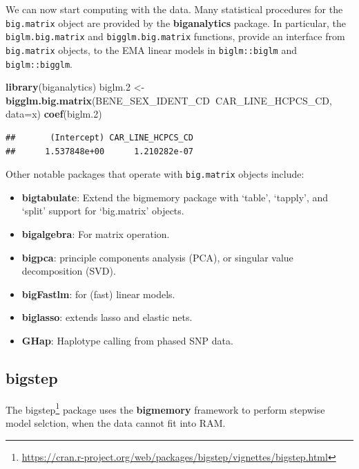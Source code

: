 \documentclass[]{book}
\newenvironment{Shaded}{\begin{snugshade}}{\end{snugshade}}
\newcommand{\DataTypeTok}[1]{\textcolor[rgb]{0.13,0.29,0.53}{#1}}
\newcommand{\FloatTok}[1]{\textcolor[rgb]{0.00,0.00,0.81}{#1}}
\newcommand{\KeywordTok}[1]{\textcolor[rgb]{0.13,0.29,0.53}{\textbf{#1}}}
\newcommand{\NormalTok}[1]{#1}
\newcommand{\OperatorTok}[1]{\textcolor[rgb]{0.81,0.36,0.00}{\textbf{#1}}}
\newcommand{\StringTok}[1]{\textcolor[rgb]{0.31,0.60,0.02}{#1}}
\providecommand{\tightlist}{%
  \setlength{\itemsep}{0pt}\setlength{\parskip}{0pt}}
\renewcommand{\href}[2]{#2\footnote{\url{#1}}}
\theoremstyle{definition}
\theoremstyle{definition}
\theoremstyle{definition}
\theoremstyle{remark}
\begin{document}
We can now start computing with the data.
Many statistical procedures for the \texttt{big.matrix} object are provided by the \textbf{biganalytics} package.
In particular, the \texttt{biglm.big.matrix} and \texttt{bigglm.big.matrix} functions, provide an interface from \texttt{big.matrix} objects, to the EMA linear models in \texttt{biglm::biglm} and \texttt{biglm::bigglm}.

\begin{Shaded}
\begin{Highlighting}[]
\KeywordTok{library}\NormalTok{(biganalytics)}
\NormalTok{biglm}\FloatTok{.2}\NormalTok{ <-}\StringTok{ }\KeywordTok{bigglm.big.matrix}\NormalTok{(BENE_SEX_IDENT_CD}\OperatorTok{~}\NormalTok{CAR_LINE_HCPCS_CD, }\DataTypeTok{data=}\NormalTok{x)}
\KeywordTok{coef}\NormalTok{(biglm}\FloatTok{.2}\NormalTok{)}
\end{Highlighting}
\end{Shaded}

\begin{verbatim}
##       (Intercept) CAR_LINE_HCPCS_CD 
##      1.537848e+00      1.210282e-07
\end{verbatim}

Other notable packages that operate with \texttt{big.matrix} objects include:

\begin{itemize}
\tightlist
\item
  \textbf{bigtabulate}: Extend the bigmemory package with `table', `tapply', and `split' support for `big.matrix' objects.
\item
  \textbf{bigalgebra}: For matrix operation.
\item
  \textbf{bigpca}: principle components analysis (PCA), or singular value decomposition (SVD).
\item
  \textbf{bigFastlm}: for (fast) linear models.
\item
  \textbf{biglasso}: extends lasso and elastic nets.
\item
  \textbf{GHap}: Haplotype calling from phased SNP data.
\end{itemize}

\hypertarget{bigstep}{%
\subsection{bigstep}\label{bigstep}}

The \href{https://cran.r-project.org/web/packages/bigstep/vignettes/bigstep.html}{bigstep} package uses the \textbf{bigmemory} framework to perform stepwise model selction, when the data cannot fit into RAM.
\end{document}
